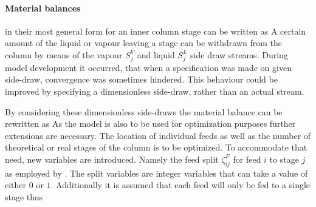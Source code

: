         \paragraph{Material balances} in their most general form for an inner column stage can be written as
        A certain amount of the liquid or vapour leaving a stage can be withdrawn from the column by means
        of the vapour $S^V_j$ and liquid $S^L_j$ side draw streams. During model development it occurred, that 
        when a specification was made on given side-draw, convergence was sometimes hindered. This behaviour 
        could be improved by specifying a dimensionless side-draw, 
        rather than an actual stream. 
        
        By considering these dimensionless side-draws the material balance can be rewritten as
        As the model is also to be used for optimization purposes further extensions are necessary.
        The location of individual feeds as well as the number of theoretical or real stages of the
        column is to be optimized. To accommodate that need, new variables are introduced. Namely the feed
        split $\zeta_{ij}^F$ for feed $i$ to stage $j$ as employed by \cite{Dunnebier.1999}.
        The split variables are integer variables that can take a value of either $0$ or $1$. Additionally it is
        assumed that each feed will only be fed to a single stage thus

